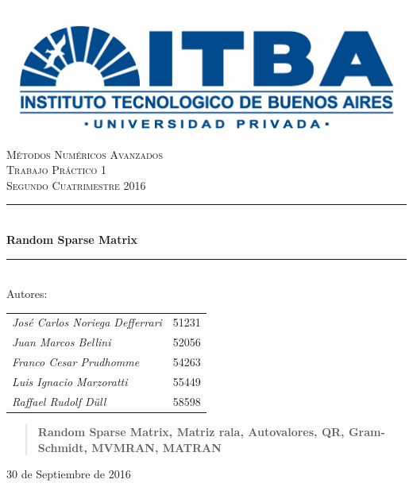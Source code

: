 \documentclass[spanish]{article}
\newcommand{\HRule}{\rule{\linewidth}{0.5mm}}
\begin{document}
    \begin{titlepage}
        \begin{center}
            
            \includegraphics[scale=0.40]{./logo_itba.png}\\[1cm]

            \textsc{\LARGE Métodos Numéricos Avanzados}\\[1.5cm]
            \textsc{\Large Trabajo Práctico 1}\\[0.5cm]
            \textsc{\Large Segundo Cuatrimestre 2016}\\[0.5cm]

            \HRule \\[0.4cm]
            { \huge \bfseries Random Sparse Matrix}\\[0.4cm]
            \HRule \\[1.5cm]
            
            \Large Autores: \\ [0.25cm]
            \begin{tabular}{l @{\ \ -\ \ }l}
                \emph{\Large José Carlos Noriega Defferrari} & \Large 51231\\[0.2cm]
                \emph{\Large Juan Marcos Bellini} & \Large 52056\\[0.2cm]
                \emph{\Large Franco Cesar Prudhomme} & \Large 54263\\[0.2cm]
                \emph{\Large Luis Ignacio Marzoratti} & \Large 55449\\[0.2cm]
                \emph{\Large Raffael Rudolf Düll} & \Large 58598\\[0.2cm]
            \end{tabular}

            \renewcommand{\abstractname}{Palabras clave:}
            
            \begin{abstract}
                \centering
                \textbf{Random Sparse Matrix, Matriz rala, Autovalores, QR, Gram-Schmidt, MVMRAN, MATRAN}
            \end{abstract}

            \vfill
            {\large 30 de Septiembre de 2016}

        \end{center}
    \end{titlepage}
\end{document}
